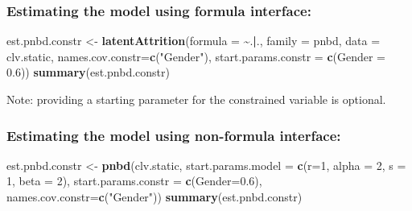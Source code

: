 \documentclass[
]{article}
\newenvironment{Shaded}{\begin{snugshade}}{\end{snugshade}}
\newcommand{\AttributeTok}[1]{\textcolor[rgb]{0.13,0.29,0.53}{#1}}
\newcommand{\DecValTok}[1]{\textcolor[rgb]{0.00,0.00,0.81}{#1}}
\newcommand{\FloatTok}[1]{\textcolor[rgb]{0.00,0.00,0.81}{#1}}
\newcommand{\FunctionTok}[1]{\textcolor[rgb]{0.13,0.29,0.53}{\textbf{#1}}}
\newcommand{\NormalTok}[1]{#1}
\newcommand{\OtherTok}[1]{\textcolor[rgb]{0.56,0.35,0.01}{#1}}
\newcommand{\SpecialCharTok}[1]{\textcolor[rgb]{0.81,0.36,0.00}{\textbf{#1}}}
\newcommand{\StringTok}[1]{\textcolor[rgb]{0.31,0.60,0.02}{#1}}
\begin{document}
\subsubsection{\texorpdfstring{\textbf{Estimating the model using
formula
interface:}}{Estimating the model using formula interface:}}\label{estimating-the-model-using-formula-interface-5}

\begin{Shaded}
\begin{Highlighting}[]
\NormalTok{est.pnbd.constr }\OtherTok{\textless{}{-}} \FunctionTok{latentAttrition}\NormalTok{(}\AttributeTok{formula =} \SpecialCharTok{\textasciitilde{}}\NormalTok{.}\SpecialCharTok{|}\NormalTok{., }\AttributeTok{family =}\NormalTok{ pnbd, }\AttributeTok{data =}\NormalTok{ clv.static,}
                                   \AttributeTok{names.cov.constr=}\FunctionTok{c}\NormalTok{(}\StringTok{"Gender"}\NormalTok{), }
                                   \AttributeTok{start.params.constr =} \FunctionTok{c}\NormalTok{(}\AttributeTok{Gender =} \FloatTok{0.6}\NormalTok{))}
\FunctionTok{summary}\NormalTok{(est.pnbd.constr)}
\end{Highlighting}
\end{Shaded}

Note: providing a starting parameter for the constrained variable is
optional.

\subsubsection{\texorpdfstring{\textbf{Estimating the model using
non-formula
interface:}}{Estimating the model using non-formula interface:}}\label{estimating-the-model-using-non-formula-interface-5}

\begin{Shaded}
\begin{Highlighting}[]
\NormalTok{est.pnbd.constr }\OtherTok{\textless{}{-}} \FunctionTok{pnbd}\NormalTok{(clv.static, }
                         \AttributeTok{start.params.model =} \FunctionTok{c}\NormalTok{(}\AttributeTok{r=}\DecValTok{1}\NormalTok{, }\AttributeTok{alpha =} \DecValTok{2}\NormalTok{, }\AttributeTok{s =} \DecValTok{1}\NormalTok{, }\AttributeTok{beta =} \DecValTok{2}\NormalTok{),}
                         \AttributeTok{start.params.constr =} \FunctionTok{c}\NormalTok{(}\AttributeTok{Gender=}\FloatTok{0.6}\NormalTok{),}
                         \AttributeTok{names.cov.constr=}\FunctionTok{c}\NormalTok{(}\StringTok{"Gender"}\NormalTok{))}
\FunctionTok{summary}\NormalTok{(est.pnbd.constr)}
\end{Highlighting}
\end{Shaded}
\end{document}
